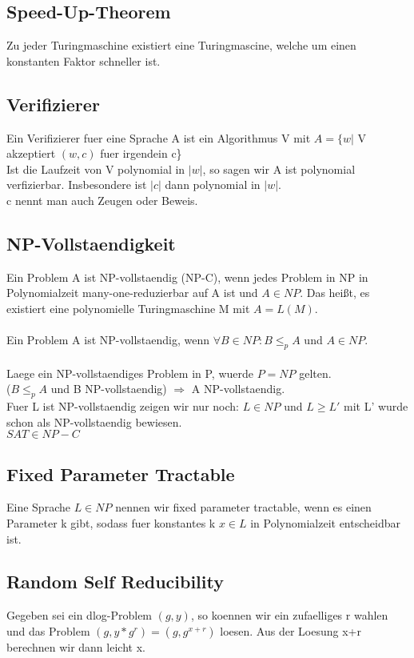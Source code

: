 \documentclass[a4paper]{scrreprt}
\begin{document}
\subsection{Speed-Up-Theorem}
Zu jeder Turingmaschine existiert eine Turingmascine, welche um einen konstanten Faktor schneller ist.

\subsection{Verifizierer}
Ein Verifizierer fuer eine Sprache A ist ein Algorithmus V mit $A = \{w|$ V akzeptiert $(w,c)$ fuer irgendein c\}\\
Ist die Laufzeit von V polynomial in $|w|$, so sagen wir A ist polynomial verfizierbar. Insbesondere ist $|c|$ dann polynomial in $|w|$.\\
c nennt man auch Zeugen oder Beweis.

\subsection{NP-Vollstaendigkeit}
Ein Problem A ist NP-vollstaendig (NP-C), wenn jedes Problem in NP in Polynomialzeit many-one-reduzierbar auf A ist und $A \in NP$.
Das heißt, es existiert eine polynomielle Turingmaschine M mit $A = L(M)$.\\\\
Ein Problem A ist NP-vollstaendig, wenn $\forall B \in NP: B \le_p A$ und $A \in NP$.\\\\
Laege ein NP-vollstaendiges Problem in P, wuerde $P = NP$ gelten.\\
($B \le_p A$ und B NP-vollstaendig) $\Rightarrow$ A NP-vollstaendig.\\
Fuer L ist NP-vollstaendig zeigen wir nur noch: $L \in NP$ und $L \ge L'$ mit L' wurde schon als NP-vollstaendig bewiesen.\\
$SAT \in NP-C$\\

\subsection{Fixed Parameter Tractable}
Eine Sprache $L \in NP$ nennen wir fixed parameter tractable, wenn es einen Parameter k gibt, sodass fuer konstantes k $x \in L$ in Polynomialzeit entscheidbar ist.

\subsection{Random Self Reducibility}
Gegeben sei ein dlog-Problem $(g, y)$, so koennen wir ein zufaelliges r wahlen und das Problem $(g, y*g^r) = (g, g^{x+r})$ loesen. Aus der Loesung x+r berechnen wir dann leicht x.
\end{document}
